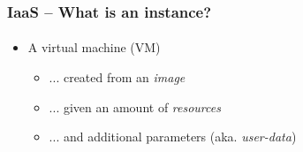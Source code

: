 \begin{frame}
\frametitle{IaaS -- What is an instance?}
\framesubtitle{}
\begin{itemize}
\item A virtual machine (VM)
  \begin{itemize}
  \item ... created from an \emph{image}
  \item ... given an amount of \emph{resources}
  \item ... and additional parameters (aka. \emph{user-data})
  \end{itemize}
\end{itemize}
\end{frame}
